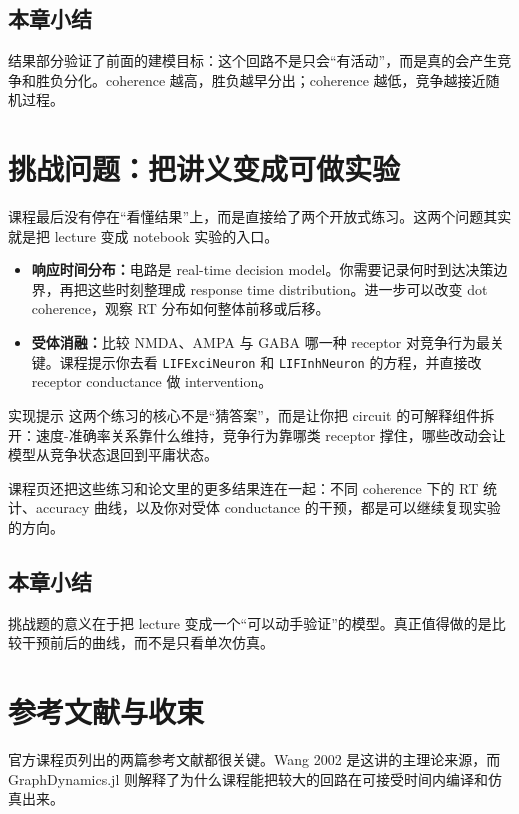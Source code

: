\documentclass[a4paper]{article}
\begin{document}
\subsection{本章小结}
结果部分验证了前面的建模目标：这个回路不是只会“有活动”，而是真的会产生竞争和胜负分化。coherence 越高，胜负越早分出；coherence 越低，竞争越接近随机过程。

\section{挑战问题：把讲义变成可做实验}
课程最后没有停在“看懂结果”上，而是直接给了两个开放式练习。这两个问题其实就是把 lecture 变成 notebook 实验的入口。

\begin{itemize}
    \item \textbf{响应时间分布：}电路是 real-time decision model。你需要记录何时到达决策边界，再把这些时刻整理成 response time distribution。进一步可以改变 dot coherence，观察 RT 分布如何整体前移或后移。
    \item \textbf{受体消融：}比较 NMDA、AMPA 与 GABA 哪一种 receptor 对竞争行为最关键。课程提示你去看 \texttt{LIFExciNeuron} 和 \texttt{LIFInhNeuron} 的方程，并直接改 receptor conductance 做 intervention。
\end{itemize}

\begin{importantbox}{实现提示}
这两个练习的核心不是“猜答案”，而是让你把 circuit 的可解释组件拆开：速度-准确率关系靠什么维持，竞争行为靠哪类 receptor 撑住，哪些改动会让模型从竞争状态退回到平庸状态。
\end{importantbox}

课程页还把这些练习和论文里的更多结果连在一起：不同 coherence 下的 RT 统计、accuracy 曲线，以及你对受体 conductance 的干预，都是可以继续复现实验的方向。

\subsection{本章小结}
挑战题的意义在于把 lecture 变成一个“可以动手验证”的模型。真正值得做的是比较干预前后的曲线，而不是只看单次仿真。

\section{参考文献与收束}
官方课程页列出的两篇参考文献都很关键。Wang 2002 是这讲的主理论来源，而 GraphDynamics.jl 则解释了为什么课程能把较大的回路在可接受时间内编译和仿真出来。
\end{document}

